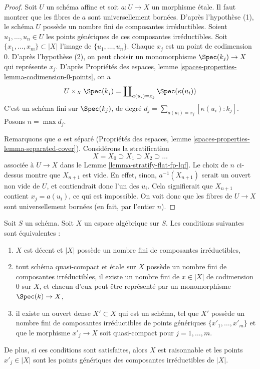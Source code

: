 \begin{proof}
Soit $U$ un schéma affine et soit $a : U \to X$ un morphisme étale.
Il faut montrer que les fibres de $a$ sont universellement bornées. D'après
l'hypothèse (1), le schéma $U$ possède un nombre fini de composantes
irréductibles. Soient $u_1, \ldots, u_n \in U$ les points génériques de ces
composantes irréductibles. Soit $\{x_1, \ldots, x_m\} \subset |X|$ l'image de
$\{u_1, \ldots, u_n\}$. Chaque $x_j$ est un point de codimension $0$.
D'après l'hypothèse (2), on peut choisir un monomorphisme
$\Spec(k_j) \to X$ qui représente $x_j$. D'après Propriétés des espaces, lemme
\ref{spaces-properties-lemma-codimension-0-points}, on a
$$
U \times_X \Spec(k_j) = \coprod\nolimits_{a(u_i) = x_j} \Spec(\kappa(u_i))
$$
C'est un schéma fini sur $\Spec(k_j)$, de degré
$d_j = \sum_{a(u_i) = x_j} [\kappa(u_i) : k_j]$. Posons $n = \max d_j$.

\medskip\noindent
Remarquons que $a$ est séparé
(Propriétés des espaces, lemme
\ref{spaces-properties-lemma-separated-cover}).
Considérons la stratification
$$
X = X_0 \supset X_1 \supset X_2 \supset \ldots
$$
associée à $U \to X$ dans le Lemme \ref{lemma-stratify-flat-fp-lqf}.
Le choix de $n$ ci-dessus montre que $X_{n + 1}$ est vide.
En effet, sinon, $a^{-1}(X_{n + 1})$ serait un ouvert non vide de $U$, et
contiendrait donc l'un des $u_i$. Cela signifierait que $X_{n + 1}$ contient
$x_j = a(u_i)$, ce qui est impossible.
On voit donc que les fibres de $U \to X$ sont universellement bornées
(en fait, par l'entier $n$).
\end{proof}

\begin{lemma}
\label{lemma-finitely-many-irreducible-components}
Soit $S$ un schéma. Soit $X$ un espace algébrique sur $S$.
Les conditions suivantes sont équivalentes :
\begin{enumerate}
\item $X$ est décent et $|X|$ possède un nombre fini de composantes
irréductibles,
\item tout schéma quasi-compact et étale sur $X$ possède un nombre fini de
composantes irréductibles, il existe un nombre fini de $x \in |X|$ de
codimension $0$ sur $X$, et chacun d'eux peut être représenté par un
monomorphisme $\Spec(k) \to X$,
\item il existe un ouvert dense $X' \subset X$ qui est un schéma, tel que
$X'$ possède un nombre fini de composantes irréductibles de points génériques
$\{x'_1, \ldots, x'_m\}$ et que le morphisme $x'_j \to X$ soit quasi-compact
pour $j = 1, \ldots, m$.
\end{enumerate}
De plus, si ces conditions sont satisfaites, alors $X$ est raisonnable et les
points $x'_j \in |X|$ sont les points génériques des composantes irréductibles
de $|X|$.
\end{lemma}

